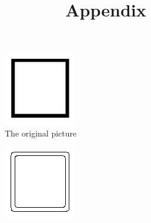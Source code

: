 \documentclass[10pt,final,journal]{IEEEtran}
\title{Appendix}
\begin{document}
\maketitle

\begin{figure}[h!]
    \centering
     \begin{subfigure}[b]{0.3\textwidth}
            \includegraphics[width=\textwidth]{square}
            \caption{The original picture}
            \label{fig:app_square}
    \end{subfigure}
    \begin{subfigure}[b]{0.3\textwidth}
            \includegraphics[width=\textwidth]{square_baseline}

\end{subfigure}
\end{figure}
\end{document}
